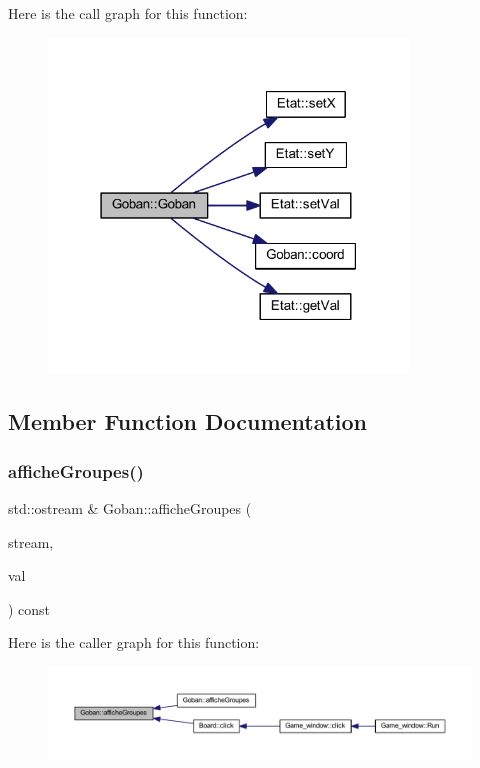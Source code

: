 Here is the call graph for this function\+:\nopagebreak
\begin{figure}[H]
\begin{center}
\leavevmode
\includegraphics[width=271pt]{class_goban_a8c49da36e406f11d33671a4c8a4c19b2_cgraph}
\end{center}
\end{figure}


\subsection{Member Function Documentation}
\mbox{\label{class_goban_aefd43ab2cf0746f2f8c653d825bf080c}} 
\subsubsection{\texorpdfstring{affiche\+Groupes()}{afficheGroupes()}\hspace{0.1cm}{\footnotesize\ttfamily [1/2]}}
{\footnotesize\ttfamily std\+::ostream \& Goban\+::affiche\+Groupes (\begin{DoxyParamCaption}\item[{std\+::ostream \&}]{stream,  }\item[{const \hyperlink{class_etat_af3ddb2296ffc379b7f3ad2bf832f294e}{Etat\+::\+V\+AL} \&}]{val }\end{DoxyParamCaption}) const}

Here is the caller graph for this function\+:\nopagebreak
\begin{figure}[H]
\begin{center}
\leavevmode
\includegraphics[width=350pt]{class_goban_aefd43ab2cf0746f2f8c653d825bf080c_icgraph}
\end{center}
\end{figure}
\mbox{\label{class_goban_a8d5df6cd74b0240f36a4056f045625b7}} 
